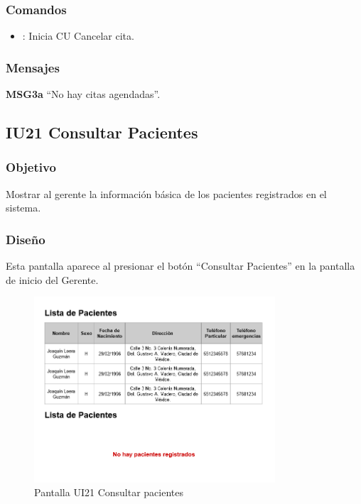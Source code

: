 \subsubsection{Comandos}
\begin{itemize}
	\item {}: Inicia CU Cancelar cita.
\end{itemize}

\subsubsection{Mensajes}
\begin{Citemize}
	\item {\bf MSG3a} ``No hay citas agendadas''.
\end{Citemize}


\subsection{IU21 Consultar Pacientes}

\subsubsection{Objetivo}
Mostrar al gerente la información básica de los pacientes registrados en el sistema.

\subsubsection{Diseño}
Esta pantalla aparece al presionar el botón ``Consultar Pacientes'' en la pantalla de inicio del Gerente.

\begin{figure}[htbp!]
	\centering
	\includegraphics[width=0.8\textwidth]{images/gui/ui21_consultar_pacientes}
	\caption{Pantalla UI21 Consultar pacientes}
\end{figure}

